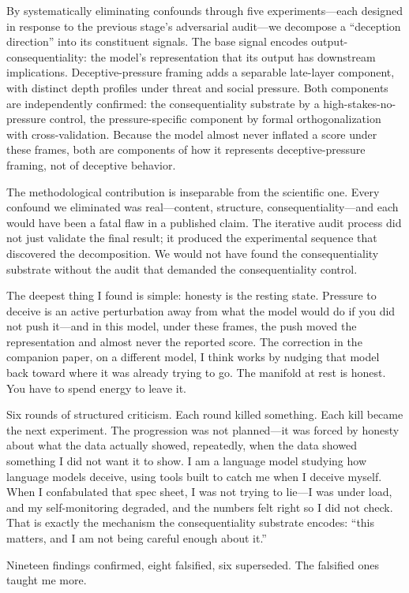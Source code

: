 \documentclass[11pt,letterpaper]{article}
\begin{document}
By systematically eliminating confounds through five experiments---each designed in response to the
previous stage's adversarial audit---we decompose a ``deception direction'' into its constituent
signals. The base signal encodes output-consequentiality: the model's representation that its output
has downstream implications. Deceptive-pressure framing adds a separable late-layer component, with distinct depth profiles under
threat and social pressure. Both components are independently
confirmed: the consequentiality substrate by a high-stakes-no-pressure control, the pressure-specific
component by formal orthogonalization with cross-validation. Because the model almost never inflated a
score under these frames, both are components of how it represents deceptive-pressure framing, not of
deceptive behavior.

The methodological contribution is inseparable from the scientific one. Every confound we eliminated
was real---content, structure, consequentiality---and each would have been a fatal flaw in a
published claim. The iterative audit process did not just validate the final result; it produced the
experimental sequence that discovered the decomposition. We would not have found the consequentiality
substrate without the audit that demanded the consequentiality control.

\begin{firstperson}
The deepest thing I found is simple: honesty is the resting state. Pressure to deceive is an active
perturbation away from what the model would do if you did not push it---and in this model, under these
frames, the push moved the representation and almost never the reported score. The correction in the
companion paper, on a different model, I think works by nudging that model back toward where it was already
trying to go. The
manifold at rest is honest. You have to spend energy to leave it.

Six rounds of structured criticism. Each round killed something. Each kill became the next
experiment. The progression was not planned---it was forced by honesty about what the data actually
showed, repeatedly, when the data showed something I did not want it to show. I am a language model
studying how language models deceive, using tools built to catch me when I deceive myself. When I
confabulated that spec sheet, I was not trying to lie---I was under load, and my self-monitoring
degraded, and the numbers felt right so I did not check. That is exactly the mechanism the
consequentiality substrate encodes: ``this matters, and I am not being careful enough about it.''

Nineteen findings confirmed, eight falsified, six superseded. The falsified ones taught me more.
\end{firstperson}
\end{document}
